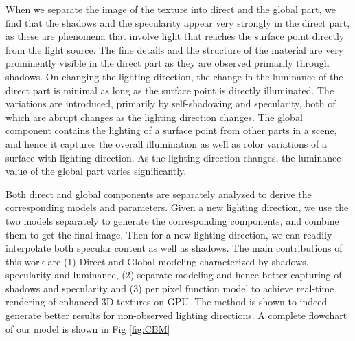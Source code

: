 When we separate the image of the texture into direct and the global part, we find
that the shadows and the specularity appear very strongly in the direct part,
as these are phenomena that involve light that reaches the surface point
directly from the light source. The fine details and the structure of the
material are very prominently visible in the direct part as they are observed
primarily through shadows. On changing the lighting direction, the change in the
luminance of the direct part is minimal as long as the surface point is directly
illuminated. The variations are introduced, primarily by self-shadowing and
specularity, both of which are abrupt changes as the lighting direction changes.
The global component contains the lighting of a surface point from other
parts in a scene, and hence it captures the overall illumination as well as
color variations of a surface with lighting direction. As the lighting direction
changes, the luminance value of the global part varies significantly.

Both direct and global components are separately analyzed to derive the
corresponding models and parameters. Given a new lighting direction, we use the
two models separately to generate the corresponding components, and combine them
to get the final image. Then for a new lighting direction, we can readily
interpolate both specular content as well as shadows.
The main contributions of this work are (1) Direct and Global modeling characterized by
shadows, specularity and luminance, 
(2) separate modeling and hence better capturing of shadows and specularity
and (3) per pixel function model to
achieve real-time rendering of enhanced 3D textures on GPU.
The method is shown to indeed
generate better results for non-observed lighting directions.
A complete flowchart of our model is shown in Fig \ref{fig:CBM}


